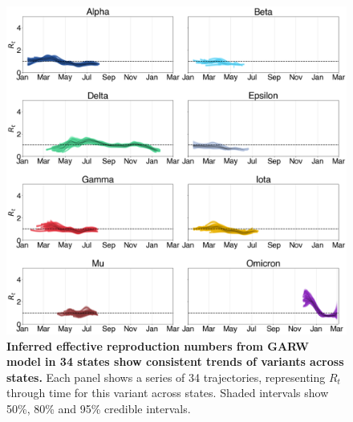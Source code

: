 \documentclass[11pt,oneside,letterpaper]{article}
\begin{document}
\begin{figure}[h!]
  \centering
  \includegraphics[width=\linewidth]{figs/rt_consensus.png}
  \caption{\textbf{Inferred effective reproduction numbers from GARW model in 34 states show consistent trends of variants across states.}
  Each panel shows a series of 34 trajectories, representing $R_t$ through time for this variant across states.
  Shaded intervals show 50\%, 80\% and 95\% credible intervals.
  }
  \label{fig:rt_consensus}
\end{figure}
\end{document}
